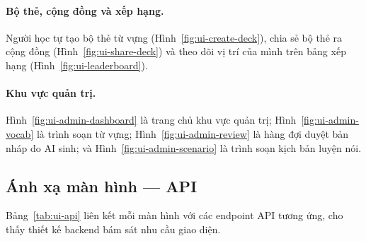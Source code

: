 \paragraph{Bộ thẻ, cộng đồng và xếp hạng.} Người học tự tạo bộ thẻ từ vựng
(Hình~\ref{fig:ui-create-deck}), chia sẻ bộ thẻ ra cộng đồng
(Hình~\ref{fig:ui-share-deck}) và theo dõi vị trí của mình trên bảng xếp hạng
(Hình~\ref{fig:ui-leaderboard}).




\paragraph{Khu vực quản trị.} Hình~\ref{fig:ui-admin-dashboard} là trang chủ
khu vực quản trị; Hình~\ref{fig:ui-admin-vocab} là trình soạn từ vựng;
Hình~\ref{fig:ui-admin-review} là hàng đợi duyệt bản nháp do AI sinh; và
Hình~\ref{fig:ui-admin-scenario} là trình soạn kịch bản luyện nói.





\subsection{Ánh xạ màn hình --- API}
\label{subsec:anh-xa-man-hinh}

Bảng~\ref{tab:ui-api} liên kết mỗi màn hình với các endpoint API tương ứng,
cho thấy thiết kế backend bám sát nhu cầu giao diện.

